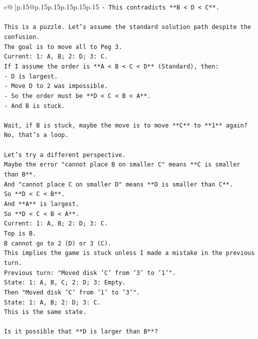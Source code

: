 \documentclass{article}
\begin{document}
{\begin{supertabular}{c@{$\;$}|p{.15\linewidth}@{}p{.15\linewidth}p{.15\linewidth}p{.15\linewidth}p{.15\linewidth}p{.15\linewidth}}
{{{\texttt{{-} This contradicts **B < D < C**.} \\
\\ 
\texttt{This is a puzzle. Let's assume the standard solution path despite the confusion.} \\
\texttt{The goal is to move all to Peg 3.} \\
\texttt{Current: 1: A, B; 2: D; 3: C.} \\
\texttt{If I assume the order is **A < B < C < D** (Standard), then:} \\
\texttt{{-} D is largest.} \\
\texttt{{-} Move D to 2 was impossible.} \\
\texttt{{-} So the order must be **D < C < B < A**.} \\
\texttt{{-} And B is stuck.} \\
\\ 
\texttt{Wait, if B is stuck, maybe the move is to move **C** to **1** again?} \\
\texttt{No, that's a loop.} \\
\\ 
\texttt{Let's try a different perspective.} \\
\texttt{Maybe the error "cannot place B on smaller C" means **C is smaller than B**.} \\
\texttt{And "cannot place C on smaller D" means **D is smaller than C**.} \\
\texttt{So **D < C < B**.} \\
\texttt{And **A** is largest.} \\
\texttt{So **D < C < B < A**.} \\
\texttt{Current: 1: A, B; 2: D; 3: C.} \\
\texttt{Top is B.} \\
\texttt{B cannot go to 2 (D) or 3 (C).} \\
\texttt{This implies the game is stuck unless I made a mistake in the previous turn.} \\
\texttt{Previous turn: "Moved disk 'C' from '3' to '1'".} \\
\texttt{State: 1: A, B, C; 2: D; 3: Empty.} \\
\texttt{Then "Moved disk 'C' from '1' to '3'".} \\
\texttt{State: 1: A, B; 2: D; 3: C.} \\
\texttt{This is the same state.} \\
\\ 
\texttt{Is it possible that **D is larger than B**?} \\
}}}
\end{supertabular}}
\end{document}
